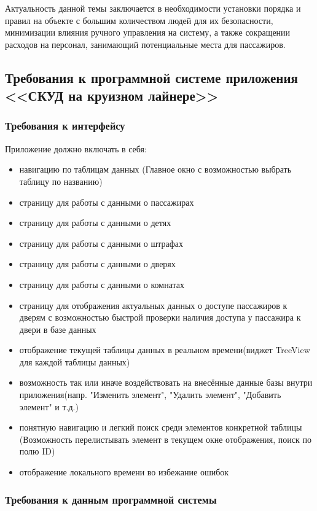 Актуальность данной темы заключается в необходимости установки порядка и правил на объекте с большим количеством людей для их безопасности, минимизации влияния ручного управления на систему, а также сокращении расходов на персонал, занимающий потенциальные места для пассажиров.

\subsection{Требования к программной системе приложения <<СКУД на круизном лайнере>>}
\subsubsection{Требования к интерфейсу}

Приложение должно включать в себя:
\begin{itemize}
	\item навигацию по таблицам данных (Главное окно с возможностью выбрать таблицу по названию)
	\item страницу для работы с данными о пассажирах
	\item страницу для работы с данными о детях
	\item страницу для работы с данными о штрафах
	\item страницу для работы с данными о дверях
	\item страницу для работы с данными о комнатах
	\item страницу для отображения актуальных данных о доступе пассажиров к дверям с возможностью быстрой проверки наличия доступа у пассажира к двери в базе данных
	\item отображение текущей таблицы данных в реальном времени(виджет TreeView для каждой таблицы данных)
	\item возможность так или иначе воздействовать на внесённые данные базы внутри приложения(напр. "Изменить элемент", "Удалить элемент", "Добавить элемент" и т.д.)
	\item понятную навигацию и легкий поиск среди элементов конкретной таблицы (Возможность перелистывать элемент в текущем окне отображения, поиск по полю ID)
	\item отображение локального времени во избежание ошибок
\end{itemize}

\subsubsection{Требования к данным программной системы}

